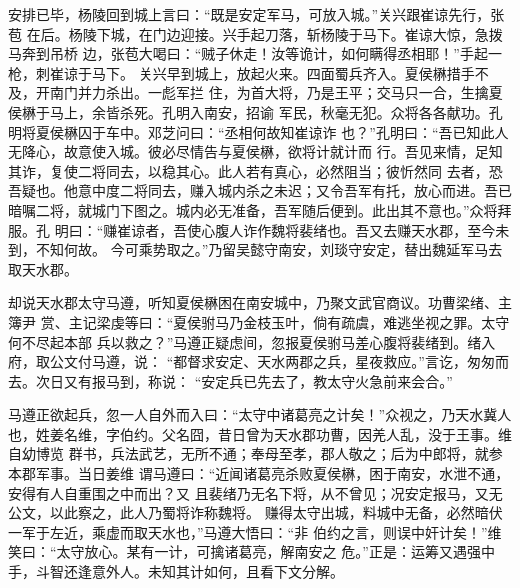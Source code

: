 安排已毕，杨陵回到城上言曰：“既是安定军马，可放入城。”关兴跟崔谅先行，张苞
在后。杨陵下城，在门边迎接。兴手起刀落，斩杨陵于马下。崔谅大惊，急拨马奔到吊桥
边，张苞大喝曰：“贼子休走！汝等诡计，如何瞒得丞相耶！”手起一枪，刺崔谅于马下。
关兴早到城上，放起火来。四面蜀兵齐入。夏侯楙措手不及，开南门并力杀出。一彪军拦
住，为首大将，乃是王平；交马只一合，生擒夏侯楙于马上，余皆杀死。孔明入南安，招谕
军民，秋毫无犯。众将各各献功。孔明将夏侯楙囚于车中。邓芝问曰：“丞相何故知崔谅诈
也？”孔明曰：“吾已知此人无降心，故意使入城。彼必尽情告与夏侯楙，欲将计就计而
行。吾见来情，足知其诈，复使二将同去，以稳其心。此人若有真心，必然阻当；彼忻然同
去者，恐吾疑也。他意中度二将同去，赚入城内杀之未迟；又令吾军有托，放心而进。吾已
暗嘱二将，就城门下图之。城内必无准备，吾军随后便到。此出其不意也。”众将拜服。孔
明曰：“赚崔谅者，吾使心腹人诈作魏将裴绪也。吾又去赚天水郡，至今未到，不知何故。
今可乘势取之。”乃留吴懿守南安，刘琰守安定，替出魏延军马去取天水郡。

却说天水郡太守马遵，听知夏侯楙困在南安城中，乃聚文武官商议。功曹梁绪、主簿尹
赏、主记梁虔等曰：“夏侯驸马乃金枝玉叶，倘有疏虞，难逃坐视之罪。太守何不尽起本部
兵以救之？”马遵正疑虑间，忽报夏侯驸马差心腹将裴绪到。绪入府，取公文付马遵，说：
“都督求安定、天水两郡之兵，星夜救应。”言讫，匆匆而去。次日又有报马到，称说：
“安定兵已先去了，教太守火急前来会合。”

马遵正欲起兵，忽一人自外而入曰：“太守中诸葛亮之计矣！”众视之，乃天水冀人
也，姓姜名维，字伯约。父名囧，昔日曾为天水郡功曹，因羌人乱，没于王事。维自幼博览
群书，兵法武艺，无所不通；奉母至孝，郡人敬之；后为中郎将，就参本郡军事。当日姜维
谓马遵曰：“近闻诸葛亮杀败夏侯楙，困于南安，水泄不通，安得有人自重围之中而出？又
且裴绪乃无名下将，从不曾见；况安定报马，又无公文，以此察之，此人乃蜀将诈称魏将。
赚得太守出城，料城中无备，必然暗伏一军于左近，乘虚而取天水也，”马遵大悟曰：“非
伯约之言，则误中奸计矣！”维笑曰：“太守放心。某有一计，可擒诸葛亮，解南安之
危。”正是：运筹又遇强中手，斗智还逢意外人。未知其计如何，且看下文分解。